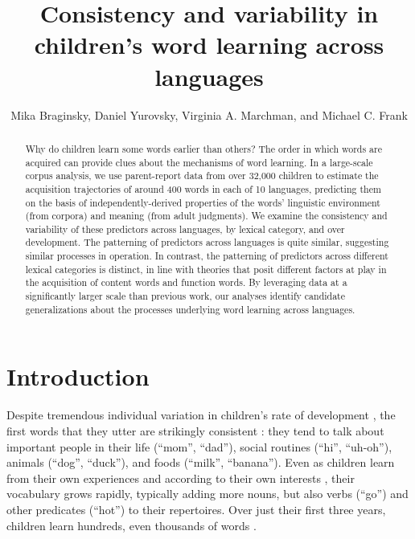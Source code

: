 \documentclass[manuscript]{stjour}
\begin{document}
\title[Word learning consistency and variability]{Consistency and variability in children's word learning across languages}

\author[Braginsky, Yurovsky, Marchman, Frank]{
      Mika Braginsky,
      Daniel Yurovsky,
      Virginia A. Marchman,
      and Michael C. Frank}




\begin{abstract}
Why do children learn some words earlier than others? The order in which
words are acquired can provide clues about the mechanisms of word
learning. In a large-scale corpus analysis, we use parent-report data
from over 32,000 children to estimate the acquisition trajectories of
around 400 words in each of 10 languages, predicting them on the basis
of independently-derived properties of the words' linguistic environment
(from corpora) and meaning (from adult judgments). We examine the
consistency and variability of these predictors across languages, by
lexical category, and over development. The patterning of predictors
across languages is quite similar, suggesting similar processes in
operation. In contrast, the patterning of predictors across different
lexical categories is distinct, in line with theories that posit
different factors at play in the acquisition of content words and
function words. By leveraging data at a significantly larger scale than
previous work, our analyses identify candidate generalizations about the
processes underlying word learning across languages.
\end{abstract}

\section{Introduction}

Despite tremendous individual variation in children's rate of
development \citep{fenson2007}, the first words that they utter are
strikingly consistent \citep{tardif2008,schneider2015}: they tend to
talk about important people in their life (``mom'', ``dad''), social
routines (``hi'', ``uh-oh''), animals (``dog'', ``duck''), and foods
(``milk'', ``banana''). Even as children learn from their own
experiences and according to their own interests
\citep{mayor2014,nelson1973}, their vocabulary grows rapidly, typically
adding more nouns, but also verbs (``go'') and other predicates
(``hot'') to their repertoires. Over just their first three years,
children learn hundreds, even thousands of words
\citep{fenson1994,mayor2011}.
\end{document}
